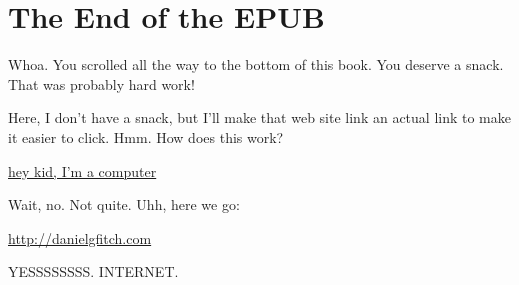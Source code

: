 \documentclass[letterpaper,12pt,oneside,openany]{memoir}
\begin{document}












%
%
%
%
%
%



\chapter*{The End of the EPUB}

Whoa. You scrolled all the way to the bottom of this book.
You deserve a snack. That was probably hard work!

Here, I don't have a snack, but I'll make that web site link an actual link to make it easier to click. Hmm. How does this work?

\begin{chatlog}
  \href{http://danielgfitch.com}{hey kid, I'm a computer}
\end{chatlog}

Wait, no. Not quite. Uhh, here we go:

\begin{chatlog}
  \href{http://danielgfitch.com}{http://danielgfitch.com}
\end{chatlog}

YESSSSSSSS. INTERNET.
\end{document}
